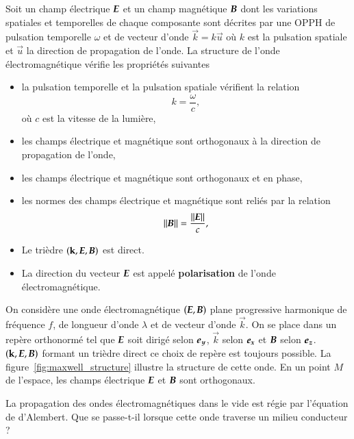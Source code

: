 \begin{defn}
Soit un champ électrique $\vece$ et un champ magnétique $\vecb$
dont les variations spatiales et temporelles de chaque composante sont décrites 
par une OPPH de pulsation temporelle $\omega$ et de vecteur d'onde $\vec{k} = k \vec{u}$
où $k$ est la pulsation spatiale et $\vec{u}$ la direction de propagation de 
l'onde. La structure de l'onde électromagnétique vérifie les propriétés suivantes
\begin{itemize}
	\item la pulsation temporelle et la pulsation spatiale vérifient la 
	  relation
	  \begin{equation*}
		 k = \dfrac{\omega}{c},
	  \end{equation*}
	  où $c$ est la vitesse de la lumière,
	\item les champs électrique et magnétique sont orthogonaux à la direction
	  de propagation de l'onde,
	\item les champs électrique et magnétique sont orthogonaux et en phase,
	\item les normes des champs électrique et magnétique sont reliés par la
	  relation
	  \begin{equation*}
		  ||\vecb|| = \dfrac{||\vece||}{c},
	 \end{equation*}
	\item Le trièdre $(\vec{k}, \vece, \vecb)$ est direct.
	\item La direction du vecteur 
	  $\vece$ est appelé \textbf{polarisation} de l'onde électromagnétique.
 \end{itemize}
\end{defn}

\begin{exemple}
	On considère une onde électromagnétique $(\vece, \vecb)$ plane progressive
	harmonique de fréquence $f$, de longueur d'onde $\lambda$ et de vecteur 
	d'onde $\vec{k}$. On se place dans un repère orthonormé tel que $\vece$
	soit dirigé selon $\ey$, $\vec{k}$ selon $\ex$ et $\vecb$ selon $\ez$.
	$(\vec{k}, \vece, \vecb)$ formant un trièdre direct ce choix de repère 
	est toujours possible. La figure~\ref{fig:maxwell_structure} illustre
	la structure de cette onde. En un point $M$ de l'espace, les champs
	électrique $\vece$ et $\vecb$ sont orthogonaux.
\end{exemple}


La propagation des ondes électromagnétiques dans le vide est régie par l'équation
de d'Alembert. Que se passe-t-il lorsque cette onde traverse un milieu conducteur ?

